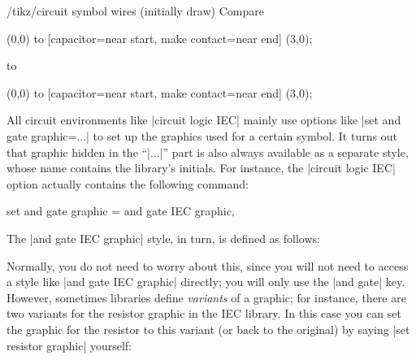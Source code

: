 \begin{itemize}
\begin{stylekey}{/tikz/circuit symbol wires (initially draw)}
            Compare
\begin{codeexample}[]
\tikz [circuit ee IEC,circuit symbol lines/.style={draw,very thick}]
  \draw (0,0) to [capacitor={near start},
                  make contact={near end}] (3,0);
\end{codeexample}
            to
\begin{codeexample}[]
\tikz [circuit ee IEC,circuit symbol wires/.style={draw,very thick}]
  \draw (0,0) to [capacitor={near start},
                  make contact={near end}] (3,0);
\end{codeexample}
        \end{stylekey}
\end{itemize}

All circuit environments like |circuit logic IEC| mainly use options like
|set and gate graphic=...| to set up the graphics used for a certain symbol. It
turns out that graphic hidden in the ``|...|'' part is also always available as
a separate style, whose name contains the library's initials. For instance, the
|circuit logic IEC| option actually contains the following command:
%
\begin{codeexample}
  set and gate graphic = and gate IEC graphic,
\end{codeexample}
%
The |and gate IEC graphic| style, in turn, is defined as follows:
%
\begin{codeexample}
\end{codeexample}

Normally, you do not need to worry about this, since you will not need to
access a style like |and gate IEC graphic| directly; you will only use the
|and gate| key. However, sometimes libraries define \emph{variants} of a
graphic; for instance, there are two variants for the resistor graphic in the
IEC library. In this case you can set the graphic for the resistor to this
variant (or back to the original) by saying |set resistor graphic| yourself:
%
\begin{codeexample}[]
\end{codeexample}



